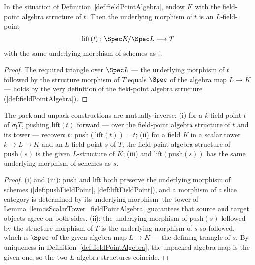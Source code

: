 \begin{definition}
  \label{def:liftFieldPoint}
  \leanok
  In the situation of Definition~\ref{def:fieldPointAlgebra}, endow \(K\) with the
  field-point algebra structure of \(t\). Then the underlying morphism of \(t\) is an
  \(L\)-field-point
  \[
    \mathrm{lift}(t) : \Spec K/\Spec L \longrightarrow T
  \]
  with the same underlying morphism of schemes as \(t\).
\end{definition}
\begin{proof}
  \leanok
  The required triangle over \(\Spec L\) --- the underlying morphism of \(t\) followed
  by the structure morphism of \(T\) equals \(\Spec\) of the algebra map \(L \to K\)
  --- holds by the very definition of the field-point algebra structure
  (\ref{def:fieldPointAlgebra}).
\end{proof}

\begin{theorem}
  \label{thm:fieldPoint_roundTrip}
  \leanok
  The pack and unpack constructions are mutually inverse:
  (i) for a \(k\)-field-point \(t\) of \(\sigma_{!}T\), pushing \(\mathrm{lift}(t)\)
  forward --- over the field-point algebra structure of \(t\) and its tower ---
  recovers \(t\): \(\mathrm{push}(\mathrm{lift}(t)) = t\);
  (ii) for a field \(K\) in a scalar tower \(k \to L \to K\) and an \(L\)-field-point
  \(s\) of \(T\), the field-point algebra structure of \(\mathrm{push}(s)\) is the
  given \(L\)-structure of \(K\);
  (iii) and \(\mathrm{lift}(\mathrm{push}(s))\) has the same underlying morphism of
  schemes as \(s\).
\end{theorem}
\begin{proof}
  \leanok
  (i) and (iii): push and lift both preserve the underlying morphism of schemes
  (\ref{def:pushFieldPoint}, \ref{def:liftFieldPoint}), and a morphism of a slice
  category is determined by its underlying morphism; the tower of
  Lemma~\ref{lem:isScalarTower_fieldPointAlgebra} guarantees that source and target
  objects agree on both sides. (ii): the underlying morphism of \(\mathrm{push}(s)\)
  followed by the structure morphism of \(T\) is the underlying morphism of \(s\) so
  followed, which is \(\Spec\) of the given algebra map \(L \to K\) --- the defining
  triangle of \(s\). By uniqueness in Definition~\ref{def:fieldPointAlgebra}, the
  unpacked algebra map is the given one, so the two \(L\)-algebra structures coincide.
\end{proof}

